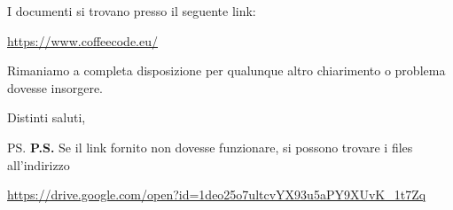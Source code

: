 \documentclass{letter}
\begin{document}
\begin{letter}{ }
I documenti si trovano presso il seguente link:
\begin{center}
  \centering
  \href{https://www.coffeecode.eu/}{https://www.coffeecode.eu/}
\end{center}
\newpage
Rimaniamo a completa disposizione per qualunque altro chiarimento o problema dovesse insorgere.

\closing{Distinti saluti,}

\ps
\textbf{P.S.} Se il link fornito non dovesse funzionare, si possono trovare i files all'indirizzo
\begin{center}
	\centering
	\href{https://drive.google.com/open?id=1deo25o7ultcvYX93u5aPY9XUvK_1t7Zq}{https://drive.google.com/open?id=1deo25o7ultcvYX93u5aPY9XUvK\_1t7Zq}
\end{center}

\end{letter}
\end{document}
